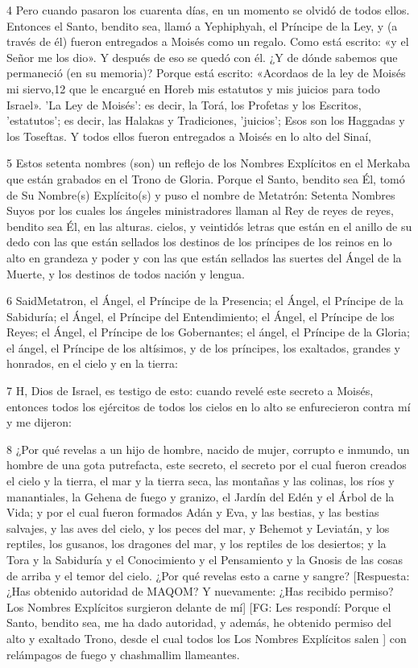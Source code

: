 \par 4 Pero cuando pasaron los cuarenta días, en un momento se olvidó de todos ellos. Entonces el Santo, bendito sea, llamó a Yephiphyah, el Príncipe de la Ley, y (a través de él) fueron entregados a Moisés como un regalo. Como está escrito: «y el Señor me los dio». Y después de eso se quedó con él. ¿Y de dónde sabemos que permaneció (en su memoria)? Porque está escrito: «Acordaos de la ley de Moisés mi siervo,12 que le encargué en Horeb mis estatutos y mis juicios para todo Israel». 'La Ley de Moisés': es decir, la Torá, los Profetas y los Escritos, 'estatutos'; es decir, las Halakas y Tradiciones, 'juicios'; Esos son los Haggadas y los Toseftas. Y todos ellos fueron entregados a Moisés en lo alto del Sinaí,

\par 5 Estos setenta nombres (son) un reflejo de los Nombres Explícitos en el Merkaba que están grabados en el Trono de Gloria. Porque el Santo, bendito sea Él, tomó de Su Nombre(s) Explícito(s) y puso el nombre de Metatrón: Setenta Nombres Suyos por los cuales los ángeles ministradores llaman al Rey de reyes de reyes, bendito sea Él, en las alturas. cielos, y veintidós letras que están en el anillo de su dedo con las que están sellados los destinos de los príncipes de los reinos en lo alto en grandeza y poder y con las que están sellados las suertes del Ángel de la Muerte, y los destinos de todos nación y lengua.

\par 6 SaidMetatron, el Ángel, el Príncipe de la Presencia; el Ángel, el Príncipe de la Sabiduría; el Ángel, el Príncipe del Entendimiento; el Ángel, el Príncipe de los Reyes; el Ángel, el Príncipe de los Gobernantes; el ángel, el Príncipe de la Gloria; el ángel, el Príncipe de los altísimos, y de los príncipes, los exaltados, grandes y honrados, en el cielo y en la tierra:

\par 7 H, Dios de Israel, es testigo de esto: cuando revelé este secreto a Moisés, entonces todos los ejércitos de todos los cielos en lo alto se enfurecieron contra mí y me dijeron:

\par 8 ¿Por qué revelas a un hijo de hombre, nacido de mujer, corrupto e inmundo, un hombre de una gota putrefacta, este secreto, el secreto por el cual fueron creados el cielo y la tierra, el mar y la tierra seca, las montañas y las colinas, los ríos y manantiales, la Gehena de fuego y granizo, el Jardín del Edén y el Árbol de la Vida; y por el cual fueron formados Adán y Eva, y las bestias, y las bestias salvajes, y las aves del cielo, y los peces del mar, y Behemot y Leviatán, y los reptiles, los gusanos, los dragones del mar, y los reptiles de los desiertos; y la Tora y la Sabiduría y el Conocimiento y el Pensamiento y la Gnosis de las cosas de arriba y el temor del cielo. ¿Por qué revelas esto a carne y sangre? [Respuesta: ¿Has obtenido autoridad de MAQOM? Y nuevamente: ¿Has recibido permiso? Los Nombres Explícitos surgieron delante de mí] [FG: Les respondí: Porque el Santo, bendito sea, me ha dado autoridad, y además, he obtenido permiso del alto y exaltado Trono, desde el cual todos los Los Nombres Explícitos salen ] con relámpagos de fuego y chashmallim llameantes.

